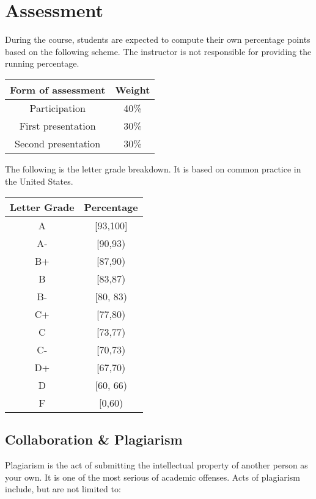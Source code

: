 \documentclass[
  openany]{book}
\begin{document}
\section*{Assessment}\label{assessment}

During the course, students are expected to compute their own percentage
points based on the following scheme.
The instructor is not responsible for providing the running percentage.

\begin{longtable}[]{@{}cc@{}}
\toprule\noalign{}
\textbf{Form of assessment} & \textbf{Weight} \\
\midrule\noalign{}
\endhead
\bottomrule\noalign{}
\endlastfoot
Participation & 40\% \\
First presentation & 30\% \\
Second presentation & 30\% \\
\end{longtable}

The following is the letter grade breakdown. It is based on
common practice in the United States.

\begin{longtable}[]{@{}cc@{}}
\toprule\noalign{}
\textbf{Letter Grade} & \textbf{Percentage} \\
\midrule\noalign{}
\endhead
\bottomrule\noalign{}
\endlastfoot
A & {[}93,100{]} \\
A- & {[}90,93) \\
B+ & {[}87,90) \\
B & {[}83,87) \\
B- & {[}80, 83) \\
C+ & {[}77,80) \\
C & {[}73,77) \\
C- & {[}70,73) \\
D+ & {[}67,70) \\
D & {[}60, 66) \\
F & {[}0,60) \\
\end{longtable}

\subsection*{Collaboration \& Plagiarism}\label{collaboration-plagiarism}

Plagiarism is the act of submitting the intellectual property of another person as your own. It is one of the most serious of academic offenses. Acts of plagiarism include, but are not limited to:
\end{document}
